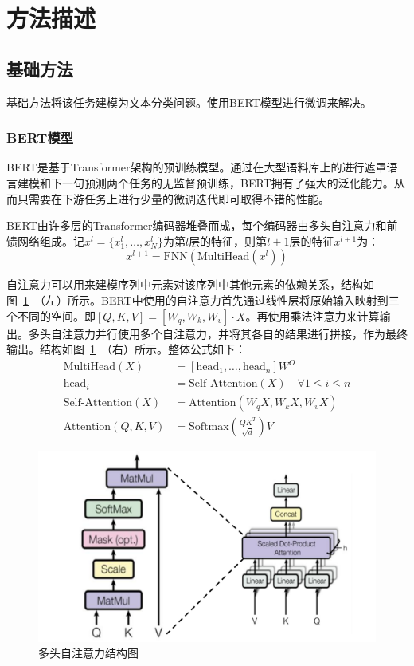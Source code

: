 \section{方法描述} %

\subsection{基础方法}

基础方法将该任务建模为文本分类问题。使用BERT模型进行微调来解决。

\subsubsection{BERT模型}

BERT是基于Transformer架构的预训练模型\cite{devlin2019bert}。通过在大型语料库上的进行遮罩语言建模和下一句预测两个任务的无监督预训练，BERT拥有了强大的泛化能力。从而只需要在下游任务上进行少量的微调迭代即可取得不错的性能。

BERT由许多层的Transformer编码器\cite{vaswani2017attention}堆叠而成，每个编码器由多头自注意力和前馈网络组成。记$x^l=\{x_1^l,\dots,x_N^l\}$为第$l$层的特征，则第$l+1$层的特征$x^{l+1}$为：
\begin{equation}
    x^{l+1} = \text{FNN}(\text{MultiHead}(x^l))
\end{equation}

自注意力可以用来建模序列中元素对该序列中其他元素的依赖关系，结构如图~\ref{fig:selfatten}~（左）所示。BERT中使用的自注意力首先通过线性层将原始输入映射到三个不同的空间。即$[Q,K,V]=[W_q,W_k,W_v]\cdot X$。再使用乘法注意力来计算输出。多头自注意力并行使用多个自注意力，并将其各自的结果进行拼接，作为最终输出。结构如图~\ref{fig:selfatten}~（右）所示。整体公式如下：
\begin{equation}
    \begin{aligned}
    \text{MultiHead}(X) &= [\text{head}_1,\dots,\text{head}_n]W^O \\
    \text{head}_i &= \text{Self-Attention}(X) \quad \forall 1\leq i\leq n \\
    \text{Self-Attention}(X) &= \text{Attention}(W_qX,W_kX,W_vX) \\
    \text{Attention}(Q,K,V) &= \text{Softmax}(\frac{QK^T}{\sqrt{d}})V 
\end{aligned}
\end{equation}

\begin{figure}
    \centering
    \includegraphics[width=.8\textwidth]{figs/atten.pdf}
    \caption{多头自注意力结构图\cite{vaswani2017attention}}
    \label{fig:selfatten}
\end{figure}

